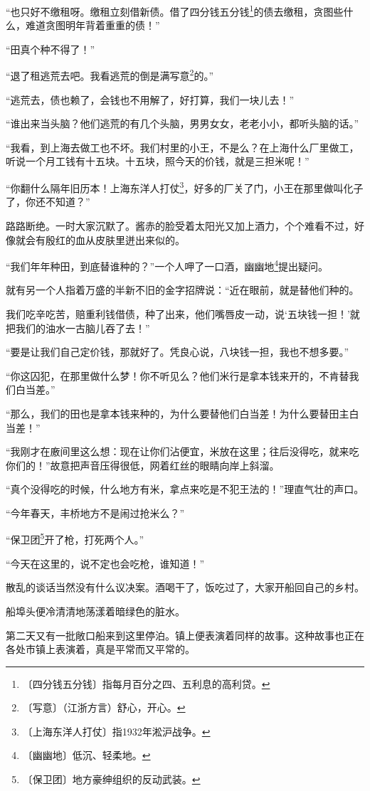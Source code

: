 \documentclass[12pt,UTF-8,openany]{ctexbook}
\begin{document}
\begin{large}
    “也只好不缴租呀。缴租立刻借新债。借了四分钱五分钱\footnote{〔四分钱五分钱〕指每月百分之四、五利息的高利贷。}的债去缴租，贪图些什么，难道贪图明年背着重重的债！” 
    
    “田真个种不得了！”
    
    “退了租逃荒去吧。我看逃荒的倒是满写意\footnote{〔写意〕（江浙方言）舒心，开心。}的。”
    
    “逃荒去，债也赖了，会钱也不用解了，好打算，我们一块儿去！”
    
    “谁出来当头脑？他们逃荒的有几个头脑，男男女女，老老小小，都听头脑的话。”
    
    “我看，到上海去做工也不坏。我们村里的小王，不是么？在上海什么厂里做工，听说一个月工钱有十五块。十五块，照今天的价钱，就是三担米呢！”
    
    “你翻什么隔年旧历本！上海东洋人打仗\footnote{〔上海东洋人打仗〕指1932年淞沪战争。}，好多的厂关了门，小王在那里做叫化子了，你还不知道？”
    
    路路断绝。一时大家沉默了。酱赤的脸受着太阳光又加上酒力，个个难看不过，好像就会有殷红的血从皮肤里迸出来似的。
    
    “我们年年种田，到底替谁种的？”一个人呷了一口酒，幽幽地\footnote{〔幽幽地〕低沉、轻柔地。}提出疑问。
    
    就有另一个人指着万盛的半新不旧的金字招牌说：“近在眼前，就是替他们种的。
    
    我们吃辛吃苦，赔重利钱借债，种了出来，他们嘴唇皮一动，说‘五块钱一担！’就把我们的油水一古脑儿吞了去！”
    
    “要是让我们自己定价钱，那就好了。凭良心说，八块钱一担，我也不想多要。”
    
    “你这囚犯，在那里做什么梦！你不听见么？他们米行是拿本钱来开的，不肯替我们白当差。”
    
    “那么，我们的田也是拿本钱来种的，为什么要替他们白当差！为什么要替田主白当差！”
    
    “我刚才在廒间里这么想：现在让你们沾便宜，米放在这里；往后没得吃，就来吃你们的！”故意把声音压得很低，网着红丝的眼睛向岸上斜溜。
    
    “真个没得吃的时候，什么地方有米，拿点来吃是不犯王法的！”理直气壮的声口。
    
    “今年春天，丰桥地方不是闹过抢米么？”
    
    “保卫团\footnote{〔保卫团〕地方豪绅组织的反动武装。}开了枪，打死两个人。”
    
    “今天在这里的，说不定也会吃枪，谁知道！”
    
    散乱的谈话当然没有什么议决案。酒喝干了，饭吃过了，大家开船回自己的乡村。
    
    船埠头便冷清清地荡漾着暗绿色的脏水。
    
    第二天又有一批敞口船来到这里停泊。镇上便表演着同样的故事。这种故事也正在各处市镇上表演着，真是平常而又平常的。
    
\end{large}
\end{document}
